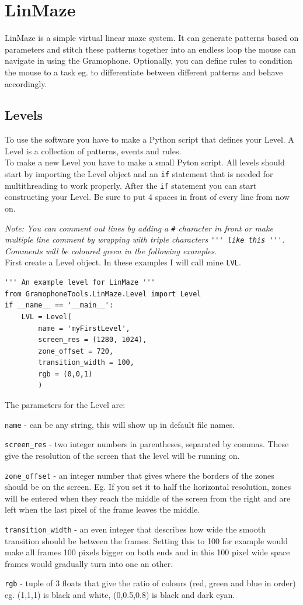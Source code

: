 \documentclass[11pt,a4paper]{article}
\newcommand{\param}[1]{\item \texttt{#1} -}
\newcommand{\note}[1]{\textit{Note: {#1}}}
\begin{document}
\section{LinMaze}
LinMaze is a simple virtual linear maze system. It can generate patterns based on parameters and stitch these patterns together into an endless loop the mouse can navigate in using the Gramophone. Optionally, you can define rules to condition the mouse to a task eg. to differentiate between different patterns and behave accordingly.

\subsection{Levels}
To use the software you have to make a Python script that defines your Level. A Level is a collection of patterns, events and rules.
\\
To make a new Level you have to make a small Pyton script. All levels should start by importing the Level object and an \lstinline{if} statement that is needed for multithreading to work properly. After the \lstinline{if} statement you can start constructing your Level. Be sure to put 4 spaces in front of every line from now on.

\note{You can comment out lines by adding a \texttt{\#} character in front or make multiple line comment by wrapping with triple \texttt{\textquotesingle} characters \lstinline{''' like this '''}. Comments will be coloured green in the following examples.}
\\

First create a Level object. In these examples I will call mine \texttt{LVL}.

\begin{lstlisting}
''' An example level for LinMaze '''
from GramophoneTools.LinMaze.Level import Level
if __name__ == '__main__':
	LVL = Level(
		name = 'myFirstLevel',
		screen_res = (1280, 1024),
		zone_offset = 720,
		transition_width = 100,
		rgb = (0,0,1)
		)
\end{lstlisting}


\newpage
The parameters for the Level are:
\begin{paramlist}  
\param{name} can be any string, this will show up in default file names.
\param{screen\_res} two integer numbers in parentheses, separated by commas. These give the resolution of the screen that the level will be running on.
\param{zone\_offset} an integer number that gives where the borders of the zones should be on the screen. Eg. If you set it to half the horizontal resolution, zones will be entered when they reach the middle of the screen from the right and are left when the last pixel of the frame leaves the middle.
\param{transition\_width} an even integer that describes how wide the smooth transition should be between the frames. Setting this to 100 for example would make all frames 100 pixels bigger on both ends and in this 100 pixel wide space frames would gradually turn into one an other.
\param{rgb} tuple of 3 floats that give the ratio of colours (red, green and blue in order) eg. (1,1,1) is black and white, (0,0.5,0.8) is black and dark cyan.
\end{paramlist}
\end{document}

